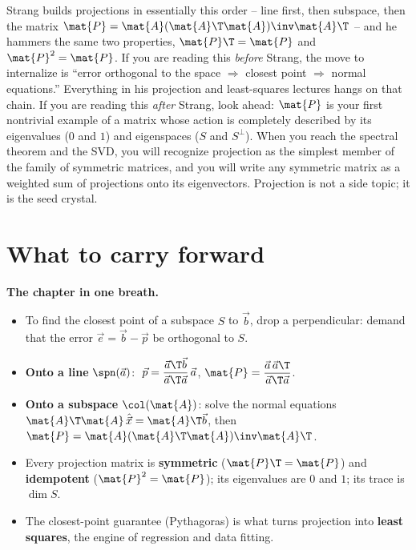 \begin{strangbox}
Strang builds projections in essentially this order -- line first, then subspace, then the matrix
$\mat{P}=\mat{A}(\mat{A}\T\mat{A})\inv\mat{A}\T$ -- and he hammers the same two properties,
$\mat{P}\T=\mat{P}$ and $\mat{P}^2=\mat{P}$. If you are reading this \emph{before} Strang, the move
to internalize is ``error orthogonal to the space $\Rightarrow$ closest point $\Rightarrow$ normal
equations.'' Everything in his projection and least-squares lectures hangs on that chain. If you are
reading this \emph{after} Strang, look ahead: $\mat{P}$ is your first nontrivial example of a matrix
whose action is completely described by its eigenvalues ($0$ and $1$) and eigenspaces ($S$ and
$S^\perp$). When you reach the spectral theorem and the SVD, you will recognize projection as the
simplest member of the family of symmetric matrices, and you will write any symmetric matrix as a
weighted sum of projections onto its eigenvectors. Projection is not a side topic; it is the
seed crystal.
\end{strangbox}

\section{What to carry forward}

\begin{focusbox}
\textbf{The chapter in one breath.}
\begin{itemize}
  \item To find the closest point of a subspace $S$ to $\vec{b}$, drop a perpendicular: demand
        that the error $\vec{e}=\vec{b}-\vec{p}$ be orthogonal to $S$.
  \item \textbf{Onto a line} $\spn(\vec{a})$:
        $\;\vec{p}=\dfrac{\vec{a}\T\vec{b}}{\vec{a}\T\vec{a}}\,\vec{a}$,
        \; $\mat{P}=\dfrac{\vec{a}\,\vec{a}\T}{\vec{a}\T\vec{a}}$.
  \item \textbf{Onto a subspace} $\col(\mat{A})$: solve the normal equations
        $\mat{A}\T\mat{A}\,\hat{\vec{x}}=\mat{A}\T\vec{b}$, then
        $\mat{P}=\mat{A}(\mat{A}\T\mat{A})\inv\mat{A}\T$.
  \item Every projection matrix is \textbf{symmetric} ($\mat{P}\T=\mat{P}$) and \textbf{idempotent}
        ($\mat{P}^2=\mat{P}$); its eigenvalues are $0$ and $1$; its trace is $\dim S$.
  \item The closest-point guarantee (Pythagoras) is what turns projection into \textbf{least
        squares}, the engine of regression and data fitting.
\end{itemize}
\end{focusbox}

